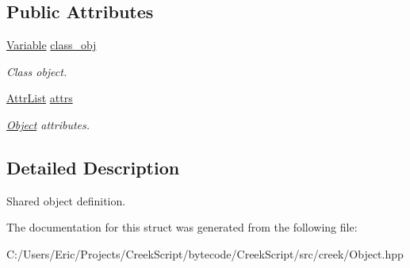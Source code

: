 \subsection*{Public Attributes}
\begin{DoxyCompactItemize}
\item 
\hyperlink{classcreek_1_1_variable}{Variable} \hyperlink{structcreek_1_1_object_1_1_definition_a1d4cac6d01cf40ef1130615000e20dfb}{class\+\_\+obj}\hypertarget{structcreek_1_1_object_1_1_definition_a1d4cac6d01cf40ef1130615000e20dfb}{}\label{structcreek_1_1_object_1_1_definition_a1d4cac6d01cf40ef1130615000e20dfb}

\begin{DoxyCompactList}\small\item\em Class object. \end{DoxyCompactList}\item 
\hyperlink{structcreek_1_1_object_1_1_definition_a0c8683f346c620b025f8f7297fd414f8}{Attr\+List} \hyperlink{structcreek_1_1_object_1_1_definition_a5c7f72922d0f1fcabc7d7e9f9250a5ae}{attrs}\hypertarget{structcreek_1_1_object_1_1_definition_a5c7f72922d0f1fcabc7d7e9f9250a5ae}{}\label{structcreek_1_1_object_1_1_definition_a5c7f72922d0f1fcabc7d7e9f9250a5ae}

\begin{DoxyCompactList}\small\item\em \hyperlink{classcreek_1_1_object}{Object} attributes. \end{DoxyCompactList}\end{DoxyCompactItemize}


\subsection{Detailed Description}
Shared object definition. 

The documentation for this struct was generated from the following file\+:\begin{DoxyCompactItemize}
\item 
C\+:/\+Users/\+Eric/\+Projects/\+Creek\+Script/bytecode/\+Creek\+Script/src/creek/Object.\+hpp\end{DoxyCompactItemize}
